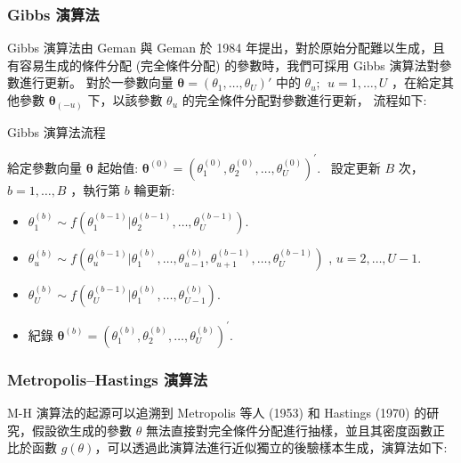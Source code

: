 \documentclass[12pt,a4paper]{article}
\begin{document}
\begin{CJK}{UTF8}{bkai}
\subsubsection{Gibbs 演算法}\label{sec:2.2.1}
Gibbs 演算法由 Geman 與 Geman 於 1984 年提出，對於原始分配難以生成，且有容易生成的條件分配 (完全條件分配) 的參數時，我們可採用 Gibbs 演算法對參數進行更新。
對於一參數向量 $\bm{\theta}=(\theta_1,\ldots,\theta_U)'$ 中的 $\theta_u;\:\: u=1,\ldots,U$ ，在給定其他參數 $\bm{\theta}_{(-u)}$ 下，以該參數 $\theta_u$ 的完全條件分配對參數進行更新，
流程如下:
\begin{algorithm}[H]
	\caption{Gibbs 演算法流程}
	\label{alg:1}
	\begin{algorithmic}[1]
	\STATE 給定參數向量 $\bm{\theta}$ 起始值: $\bm{\theta}^{(0)} = \left(\theta_1^{(0)},\theta_2^{(0)},\dots,\theta_U^{(0)}\right)^\prime$. \
	\STATE 設定更新 $B$ 次， $b =1,\dots,B$ ，執行第 $b$ 輪更新:
    \begin{itemize}
	\item  $\theta_1^{(b)} \sim f \left(\theta_1^{(b-1)}|\theta_2^{(b-1)},\dots,\theta_U^{(b-1)}\right)$.
	\item  $\theta_u^{(b)} \sim f \left(\theta_u^{(b-1)}|\theta_1^{(b)},\dots,\theta_{u-1}^{(b)},\theta_{u+1}^{(b-1)},\dots,\theta_U^{(b-1)}\right)$ , $u=2,\dots,{U-1}$.
	\item $\theta_U^{(b)} \sim f \left(\theta_U^{(b-1)}|\theta_1^{(b)},\dots,\theta_{U-1}^{(b)}\right)$.
	\item 紀錄 $\bm{\theta}^{(b)} = \left(\theta_1^{(b)},\theta_2^{(b)},\dots,\theta_U^{(b)}\right)^\prime$.
    \end{itemize}
	\end{algorithmic}
\end{algorithm}
\noindent

\subsubsection{Metropolis--Hastings 演算法}\label{sec:2.2.2}
M-H 演算法的起源可以追溯到 Metropolis 等人 (1953) 和 Hastings (1970) 的研究，假設欲生成的參數 $\theta$ 無法直接對完全條件分配進行抽樣，並且其密度函數正比於函數 $g(\theta)$，可以透過此演算法進行近似獨立的後驗樣本生成，演算法如下:


\end{CJK}
\end{document}
